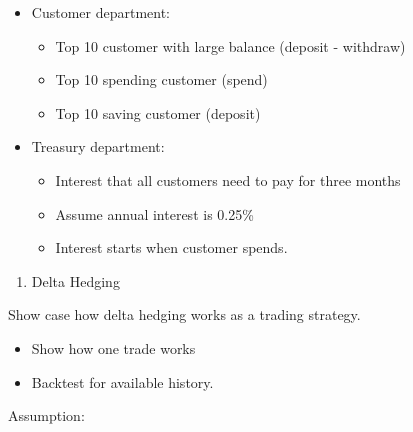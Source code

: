 \documentclass[]{article}
\providecommand{\tightlist}{%
  \setlength{\itemsep}{0pt}\setlength{\parskip}{0pt}}
\begin{document}
\begin{itemize}
\begin{itemize}
    \begin{itemize}
    \tightlist
    \item
      Customer department:

      \begin{itemize}
      \tightlist
      \item
        Top 10 customer with large balance (deposit - withdraw)
      \item
        Top 10 spending customer (spend)
      \item
        Top 10 saving customer (deposit)
      \end{itemize}
    \item
      Treasury department:

      \begin{itemize}
      \tightlist
      \item
        Interest that all customers need to pay for three months
      \item
        Assume annual interest is 0.25\%
      \item
        Interest starts when customer spends.
      \end{itemize}
    \end{itemize}
  \end{itemize}
\end{itemize}

\begin{enumerate}
\def\labelenumi{\arabic{enumi}.}
\setcounter{enumi}{1}
\tightlist
\item
  Delta Hedging
\end{enumerate}

Show case how delta hedging works as a trading strategy.

\begin{itemize}
\tightlist
\item
  Show how one trade works
\item
  Backtest for available history.
\end{itemize}

Assumption:
\end{document}
